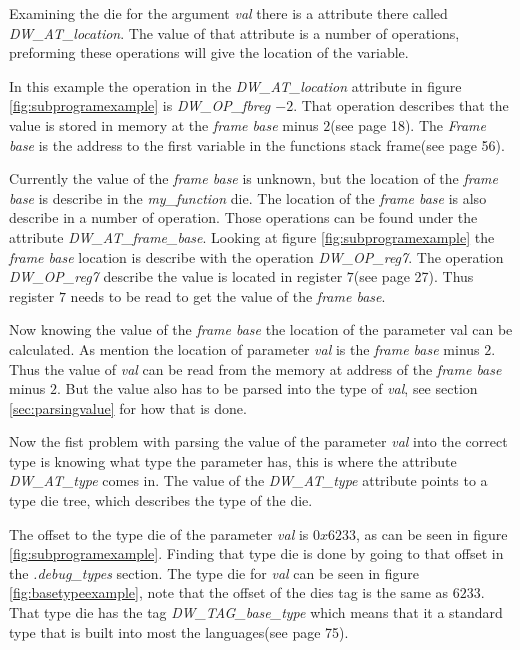 Examining the \gls{die} for the argument \emph{val} there is a attribute there called \emph{DW\_AT\_location}.
The value of that attribute is a number of operations, preforming these operations will give the location of the variable.


In this example the operation in the \emph{DW\_AT\_location} attribute in figure \ref{fig:subprogramexample} is \emph{DW\_OP\_fbreg $-2$}.
That operation describes that the value is stored in memory at the \emph{frame base} minus $2$(see \cite{dwarf} page 18).
The \emph{Frame base} is the address to the first variable in the functions stack frame(see \cite{dwarf} page 56).


Currently the value of the \emph{frame base} is unknown, but the location of the \emph{frame base}  is describe in the \emph{my\_function} \gls{die}.
The location of the \emph{frame base} is also describe in a number of operation.
Those operations can be found under the attribute \emph{DW\_AT\_frame\_base}.
Looking at figure \ref{fig:subprogramexample} the \emph{frame base} location is describe with the operation \emph{DW\_OP\_reg7}.
The operation \emph{DW\_OP\_reg7} describe the value is located in register $7$(see \cite{dwarf} page 27).
Thus register $7$ needs to be read to get the value of the \emph{frame base}.


Now knowing the value of the \emph{frame base} the location of the parameter val can be calculated.
As mention the location of parameter \emph{val} is the \emph{frame base} minus $2$.
Thus the value of \emph{val} can be read from the memory at address of the \emph{frame base} minus $2$.
But the value also has to be parsed into the type of \emph{val}, see section \ref{sec:parsingvalue} for how that is done.


 \label{sec:parsingvalue}
Now the fist problem with parsing the value of the parameter \emph{val} into the correct type is knowing what type the parameter has, this is where the attribute \emph{DW\_AT\_type} comes in.
The value of the \emph{DW\_AT\_type} attribute points to a type \gls{die} tree, which describes the type of the \gls{die}.


The offset to the type \gls{die} of the parameter \emph{val} is $0x6233$, as can be seen in figure \ref{fig:subprogramexample}.
Finding that type \gls{die} is done by going to that offset in the \emph{.debug\_types} section.
The type \gls{die} for \emph{val} can be seen in figure \ref{fig:basetypeexample}, note that the offset of the \glspl{die} tag is the same as $6233$.
That type \gls{die} has the tag \emph{DW\_TAG\_base\_type} which means that it a standard type that is built into most the languages(see \cite{dwarf} page 75).


